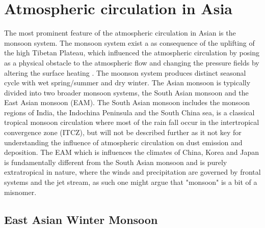 \section{Atmospheric circulation in Asia}
The most prominent feature of the atmospheric circulation in Asian is the monsoon system. The monsoon system exist a as consequence of the uplifting of the high Tibetan Plateau, which influenced the atmospheric circulation by posing as a physical obstacle to the atmospheric flow and changing the pressure fields by altering the surface heating \parencite{molnar_orographic_2010}. The moonson system produces distinct seasonal cycle with wet spring/summer and dry winter. The Asian monsoon is typically divided into two broader monsoon systems, the South Asian monsoon and the East Asian monsoon (EAM). The South Asian monsoon includes the monsoon regions of India, the Indochina Peninsula and the South China sea, is a classical tropical monsoon circulation where most of the rain fall occur in the intertropical convergence zone (ITCZ), but will not be described further as it not key for understanding the influence of atmospheric circulation on dust emission and deposition. The EAM which is influences the climates of China, Korea and Japan is fundamentally different from the South Asian monsoon and is purely extratropical in nature, where the winds and precipitation are governed by frontal systems and the jet stream, as such one might argue that "monsoon" is a bit of a misnomer.

\subsection{East Asian Winter Monsoon}
